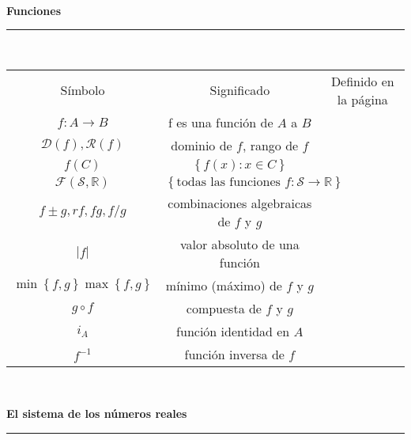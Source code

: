 \documentclass[a4,paper]{article}
\newcommand{\centrado}[1]{
	\ \\[.1\baselineskip]
	{\Large\bfseries\centering #1\par}
	\hrule
	\ \\[.1\baselineskip]
}
\begin{document}
\centrado{Funciones}
\begin{tabular}{ccc}
		Símbolo & Significado & Definido en la página \\
		$f\colon A\rightarrow B$ & f es una función de $A$ a $B$ & \\
		$\mathcal{D}(f),\mathcal{R}(f)$ & dominio de $f$, rango de $f$ \\
		$f(C)$ & $\left\{f(x):x\in C\right\}$ & \\
		$\mathcal{F}\left(\mathcal{S},\mathbb{R}\right)$ & $\left\{\text{todas las funciones }f\colon\mathcal{S}\rightarrow\mathbb{R}\right\}$ & \\
		$f\pm g,rf,fg,f/g$ & combinaciones algebraicas de $f$ y $g$ & \\
		$|f|$ & valor absoluto de una función & \\
		$\min\left\{f,g\right\}\max\left\{f,g\right\}$ & mínimo (máximo) de $f$ y $g$ & \\
		$g\circ f$ & compuesta de $f$ y $g$ & \\
		$i_{A}$ & función identidad en $A$ & \\
		$f^{-1}$ & función inversa de $f$ & \\
\end{tabular}
\centrado{El sistema de los números reales}
\end{document}
